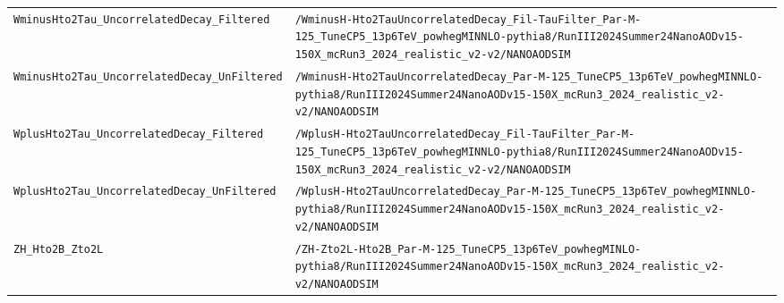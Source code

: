 \begin{longtable}{@{}>{\RaggedRight\arraybackslash}p{} >{\RaggedRight\arraybackslash}p{}@{}}
\addlinespace[2pt]
\texttt{WminusHto2Tau\_\allowbreak{}UncorrelatedDecay\_\allowbreak{}Filtered} & \texttt{/\allowbreak{}WminusH-\allowbreak{}Hto2TauUncorrelatedDecay\_\allowbreak{}Fil-\allowbreak{}TauFilter\_\allowbreak{}Par-\allowbreak{}M-\allowbreak{}125\_\allowbreak{}TuneCP5\_\allowbreak{}13p6TeV\_\allowbreak{}powhegMINNLO-\allowbreak{}pythia8/\allowbreak{}RunIII2024Summer24NanoAODv15-\allowbreak{}150X\_\allowbreak{}mcRun3\_\allowbreak{}2024\_\allowbreak{}realistic\_\allowbreak{}v2-\allowbreak{}v2/\allowbreak{}NANOAODSIM} \\
\addlinespace[2pt]
\texttt{WminusHto2Tau\_\allowbreak{}UncorrelatedDecay\_\allowbreak{}UnFiltered} & \texttt{/\allowbreak{}WminusH-\allowbreak{}Hto2TauUncorrelatedDecay\_\allowbreak{}Par-\allowbreak{}M-\allowbreak{}125\_\allowbreak{}TuneCP5\_\allowbreak{}13p6TeV\_\allowbreak{}powhegMINNLO-\allowbreak{}pythia8/\allowbreak{}RunIII2024Summer24NanoAODv15-\allowbreak{}150X\_\allowbreak{}mcRun3\_\allowbreak{}2024\_\allowbreak{}realistic\_\allowbreak{}v2-\allowbreak{}v2/\allowbreak{}NANOAODSIM} \\
\addlinespace[2pt]
\texttt{WplusHto2Tau\_\allowbreak{}UncorrelatedDecay\_\allowbreak{}Filtered} & \texttt{/\allowbreak{}WplusH-\allowbreak{}Hto2TauUncorrelatedDecay\_\allowbreak{}Fil-\allowbreak{}TauFilter\_\allowbreak{}Par-\allowbreak{}M-\allowbreak{}125\_\allowbreak{}TuneCP5\_\allowbreak{}13p6TeV\_\allowbreak{}powhegMINNLO-\allowbreak{}pythia8/\allowbreak{}RunIII2024Summer24NanoAODv15-\allowbreak{}150X\_\allowbreak{}mcRun3\_\allowbreak{}2024\_\allowbreak{}realistic\_\allowbreak{}v2-\allowbreak{}v2/\allowbreak{}NANOAODSIM} \\
\addlinespace[2pt]
\texttt{WplusHto2Tau\_\allowbreak{}UncorrelatedDecay\_\allowbreak{}UnFiltered} & \texttt{/\allowbreak{}WplusH-\allowbreak{}Hto2TauUncorrelatedDecay\_\allowbreak{}Par-\allowbreak{}M-\allowbreak{}125\_\allowbreak{}TuneCP5\_\allowbreak{}13p6TeV\_\allowbreak{}powhegMINNLO-\allowbreak{}pythia8/\allowbreak{}RunIII2024Summer24NanoAODv15-\allowbreak{}150X\_\allowbreak{}mcRun3\_\allowbreak{}2024\_\allowbreak{}realistic\_\allowbreak{}v2-\allowbreak{}v2/\allowbreak{}NANOAODSIM} \\
\addlinespace[2pt]
\texttt{ZH\_\allowbreak{}Hto2B\_\allowbreak{}Zto2L} & \texttt{/\allowbreak{}ZH-\allowbreak{}Zto2L-\allowbreak{}Hto2B\_\allowbreak{}Par-\allowbreak{}M-\allowbreak{}125\_\allowbreak{}TuneCP5\_\allowbreak{}13p6TeV\_\allowbreak{}powhegMINLO-\allowbreak{}pythia8/\allowbreak{}RunIII2024Summer24NanoAODv15-\allowbreak{}150X\_\allowbreak{}mcRun3\_\allowbreak{}2024\_\allowbreak{}realistic\_\allowbreak{}v2-\allowbreak{}v2/\allowbreak{}NANOAODSIM} \\

\end{longtable}
